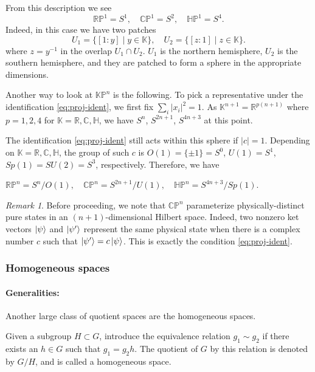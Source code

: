 \documentclass[12pt]{article}
\numberwithin{equation}{section}
\theoremstyle{remark}
\newtheorem{remark}[definition]{Remark}
\def\bC{\mathbb{C}}
\def\bH{\mathbb{H}}
\def\bK{\mathbb{K}}
\def\bR{\mathbb{R}}
\def\RP{\mathbb{RP}}
\def\CP{\mathbb{CP}}
\def\HP{\mathbb{HP}}
\def\KP{\mathbb{KP}}
\begin{document}
From this description we see \begin{equation}
\RP^1=S^1,\quad
\CP^1=S^2,\quad
\HP^1=S^4.
\label{eq:KP1}
\end{equation}
Indeed, in this case we have two patches \begin{equation}
  U_1 = \{ [1:y] \mid y\in \bK \}, \quad U_2 = \{ [z:1] \mid z\in \bK \}.
\end{equation} where $z=y^{-1}$ in the overlap $U_1\cap U_2$.
$U_1$ is the northern hemisphere,
$U_2$ is the southern hemisphere,
and they are patched to form a sphere in the appropriate dimensions.

Another way to look at $\KP^n$ is the following. 
To pick a representative under the identification \eqref{eq:proj-ident},
we first fix $\sum_i |x_i|^2 =1$.
As $\bK^{n+1}=\bR^{p(n+1)}$ where $p=1,2,4$ for $\bK=\bR,\bC,\bH$,
we have $S^n$, $S^{2n+1}$, $S^{4n+3}$ at this point.

The identification \eqref{eq:proj-ident} still acts within this sphere
if $|c|=1$. 
Depending on $\bK=\bR,\bC,\bH$, the group of such $c$ is $O(1)=\{\pm1\}=S^0$, $U(1)=S^1$, $Sp(1)=SU(2)=S^3$, respectively.
Therefore, we have \begin{proposition}
\label{prop:sphere-proj}
$\RP^n=S^n/O(1), \quad \CP^n=S^{2n+1}/U(1), \quad \HP^n=S^{4n+3}/Sp(1)$.
\end{proposition}

\begin{remark}
Before proceeding, we note that $\CP^n$ parameterize physically-distinct pure states 
in an $(n+1)$-dimensional Hilbert space.
Indeed, two nonzero ket vectors $\ket{\psi}$ and $\ket{\psi'}$ represent the same physical state
when there is a complex number $c$ such that $\ket{\psi'}=c\ket{\psi}$.
This is exactly the condition \eqref{eq:proj-ident}.
\end{remark}


\subsubsection{Homogeneous spaces}
\label{sec:homogeneous}
\paragraph{Generalities:}
Another large class of quotient spaces
are the homogeneous spaces.
\begin{definition}
  \label{def:homogeneous-space}
  Given a subgroup $H\subset G$,
  introduce the equivalence relation $g_1\sim g_2$ if 
  there exists an $h\in G$ such that $g_1=g_2 h$.
  The quotient of $G$ by this relation is denoted by $G/H$,
  and is called a homogeneous space.
\end{definition}
\end{document}
